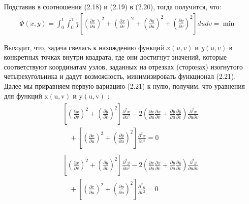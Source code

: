 \documentclass[a4paper,14pt,russian]{extreport}
\renewcommand{\_}{\kern-1.5pt\textunderscore\kern-1.5pt}
\begin{document}
Подставив в соотношения (2.18) и (2.19) в (2.20), тогда получится, что:
\begin{equation}
\begin{gathered}
\Phi(x, y)=\int_0^1 \int_0^1 \frac{1}{J}\left[\left(\frac{\partial x}{\partial u}\right)^2+\left(\frac{\partial x}{\partial v}\right)^2+\left(\frac{\partial y}{\partial u}\right)^2+\left(\frac{\partial y}{\partial v}\right)^2\right] d u d v=\min
\end{gathered}
\end{equation}

Выходит, что, задача свелась к нахождению функций $x(u, v)$ и $y(u, v)$ в конкретных точках внутри квадрата, где они достигнут значений, которые соответствуют координатам узлов, заданных на отрезках (сторонах) изогнутого четырехугольника и дадут возможность, минимизировать функционал (2.21). Далее мы приравняем первую вариацию (2.21) к нулю, получим, что уравнения для функций $\mathrm{x}(\mathrm{u}, \mathrm{v})$ и $\mathrm{y}(\mathrm{u}, \mathrm{v})$ :
\begin{equation}
\begin{gathered}
\begin{split}
& \left[\left(\frac{\partial x}{\partial v}\right)^2 + \left(\frac{\partial y}{\partial v}\right)^2\right] \frac{\partial^2 x}{\partial u^2} 
- 2 \left(\frac{\partial x}{\partial u} \frac{\partial x}{\partial v} + \frac{\partial y}{\partial u} \frac{\partial y}{\partial v}\right) \frac{\partial^2 x}{\partial u \partial v} \\
& \quad + \left[\left(\frac{\partial x}{\partial u}\right)^2 + \left(\frac{\partial y}{\partial u}\right)^2\right] \frac{\partial^2 x}{\partial v^2} = 0
\end{split} \\
\begin{split}
& \left[\left(\frac{\partial x}{\partial v}\right)^2 + \left(\frac{\partial y}{\partial v}\right)^2\right] \frac{\partial^2 y}{\partial u^2} 
- 2 \left(\frac{\partial x}{\partial u} \frac{\partial x}{\partial v} + \frac{\partial y}{\partial u} \frac{\partial y}{\partial v}\right) \frac{\partial^2 y}{\partial u \partial v} \\
& \quad + \left[\left(\frac{\partial x}{\partial u}\right)^2 + \left(\frac{\partial y}{\partial u}\right)^2\right] \frac{\partial^2 y}{\partial v^2} = 0
\end{split}
\end{gathered}
\end{equation}
\end{document}
